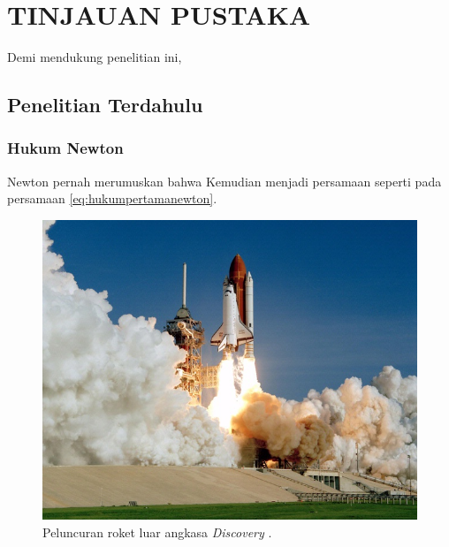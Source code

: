 \chapter{TINJAUAN PUSTAKA}
\label{chap:tinjauanpustaka}


Demi mendukung penelitian ini, \lipsum[1][1-5]

\section{Penelitian Terdahulu}
\label{sec:penelitianterdahulu}

\subsection{Hukum Newton}
\label{subsec:hukumnewton}

Newton \citep{newton1687} pernah merumuskan bahwa \lipsum[1]
Kemudian menjadi persamaan seperti pada persamaan \ref{eq:hukumpertamanewton}.

\begin{figure}[ht]
  \centering

  \includegraphics[scale=0.35]{gambar/roketluarangkasa.jpg}

  \caption{Peluncuran roket luar angkasa \emph{Discovery} \citep{roketluarangkasa}.}
  \label{fig:roketluarangkasa}
\end{figure}

